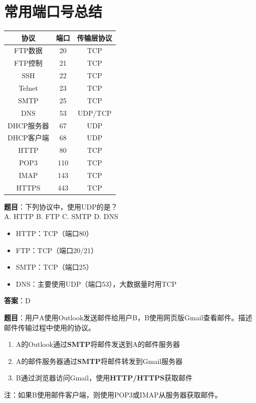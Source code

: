 \section{常用端口号总结}
\begin{table}[htbp]
\centering\small
\begin{tabular}{ccc}
\toprule
\textbf{协议} & \textbf{端口} & \textbf{传输层协议} \\
\midrule
FTP数据 & 20 & TCP \\
FTP控制 & 21 & TCP \\
SSH & 22 & TCP \\
Telnet & 23 & TCP \\
SMTP & 25 & TCP \\
DNS & 53 & UDP/TCP \\
DHCP服务器 & 67 & UDP \\
DHCP客户端 & 68 & UDP \\
HTTP & 80 & TCP \\
POP3 & 110 & TCP \\
IMAP & 143 & TCP \\
HTTPS & 443 & TCP \\
\bottomrule
\end{tabular}
\end{table}

\begin{examplebox}[例题6.3 应用层协议]
\textbf{题目}：下列协议中，使用UDP的是？\\
A. HTTP \quad B. FTP \quad C. SMTP \quad D. DNS
\tcblower
\begin{itemize}[itemsep=0pt]
    \item HTTP：TCP（端口80）
    \item FTP：TCP（端口20/21）
    \item SMTP：TCP（端口25）
    \item DNS：主要使用UDP（端口53），大数据量时用TCP
\end{itemize}
\textbf{答案}：D
\end{examplebox}

\begin{examplebox}[例题6.4 邮件协议]
\textbf{题目}：用户A使用Outlook发送邮件给用户B，B使用网页版Gmail查看邮件。描述邮件传输过程中使用的协议。
\tcblower
\begin{enumerate}[itemsep=0pt]
    \item A的Outlook通过\textbf{SMTP}将邮件发送到A的邮件服务器
    \item A的邮件服务器通过\textbf{SMTP}将邮件转发到Gmail服务器
    \item B通过浏览器访问Gmail，使用\textbf{HTTP/HTTPS}获取邮件
\end{enumerate}

注：如果B使用邮件客户端，则使用POP3或IMAP从服务器获取邮件。
\end{examplebox}

